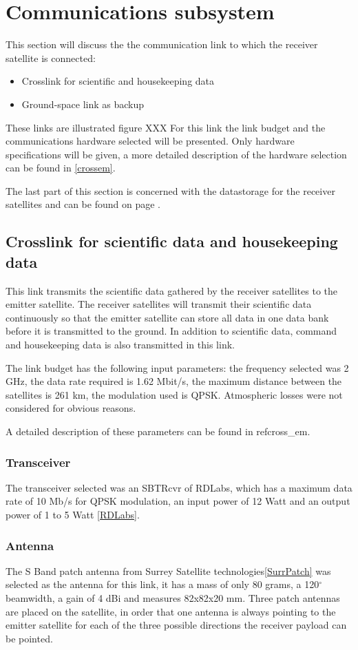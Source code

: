 \section{Communications subsystem}
This section will discuss the  the communication link to which the receiver satellite is connected:
\begin{itemize}
\item Crosslink for scientific and housekeeping data
\item Ground-space link as backup
\end{itemize}

These links are illustrated figure XXX
For this link the link budget and the communications hardware selected will be presented. Only hardware specifications will be given, a more detailed description of the hardware selection can be found in \ref{crossem}.

The last part of this section is concerned with the datastorage for the receiver satellites and can be found on page \pageref{DSReciever}.

\subsection{Crosslink for scientific data and housekeeping data}
This link transmits the scientific data gathered by the receiver satellites to the emitter satellite. The receiver satellites will transmit their scientific data continuously so that the emitter satellite can store all data in one data bank before it is transmitted to the ground. In addition to scientific data, command and housekeeping data is also transmitted in this link.

The link budget has the following input parameters: the frequency selected was 2 GHz, the data rate required is 1.62 Mbit/s, the maximum distance between the satellites is 261 km, the modulation used is QPSK. Atmospheric losses were not considered for obvious reasons.

A detailed description of these parameters can be found in ref{cross_em}.

\subsubsection{Transceiver}
The transceiver selected was an SBTRcvr of RDLabs, which has a maximum data rate of 10 Mb/s for QPSK modulation, an input power of 12 Watt and an output power of 1 to 5 Watt \ref{RDLabs}.

\subsubsection{Antenna}
The S Band patch antenna from Surrey Satellite technologies\ref{SurrPatch} was selected as the antenna for this link, it has a mass of only 80 grams, a 120$^{\circ}$ beamwidth, a gain of 4 dBi and measures 82x82x20 mm. Three patch antennas are placed on the satellite, in order that one antenna is always pointing to the emitter satellite for each of the three possible directions the receiver payload can be pointed.

